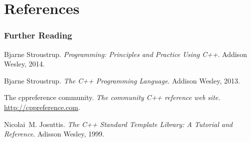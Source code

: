 \section{References}

\begin{frame} \frametitle<presentation>{Further Reading}

\begin{thebibliography}{Vandervoorde and Josuttis(2003)}

Bjarne Stroustrup.
\newblock \emph{Programming: Principles and Practice Using C++}.
\newblock Addison Wesley, 2014.

Bjarne Stroustrup.
\newblock \emph{The C++ Programming Language}.
\newblock Addison Wesley, 2013.

The cppreference community.
\newblock \emph{The community C++ reference web site.}
\newblock \alert<2>{\url{http://cppreference.com}}.

Nicolai~M. Josuttis.
\newblock \emph{The C++ Standard Template Library: A Tutorial and Reference}.
\newblock Adisson Wesley, 1999.

\end{thebibliography}
\end{frame}



